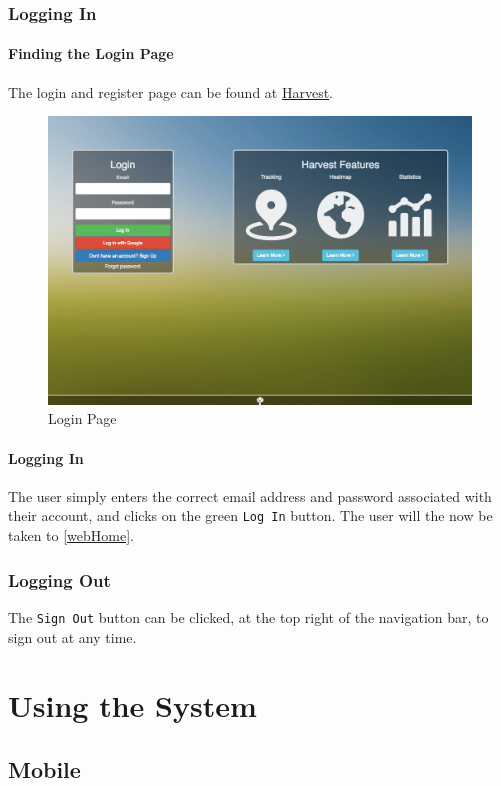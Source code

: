 \documentclass[11pt]{article}
\begin{document}
\subsubsection{Logging In}
\paragraph{Finding the Login Page}The login and register page can be found at \href{https://harvestapp.co.za}{Harvest}.

\begin{figure}
 \centering
 \includegraphics[width=12cm, keepaspectratio]{Images/GettingStarted/WebLogin.png}
 \caption{Login Page}
 \label{LoginPage}
\end{figure}

\paragraph{Logging In}The user simply enters the correct email address and password associated with their account, and clicks on the green \texttt{Log In} button. The user will the now be taken to \ref{webHome}.

\subsubsection{Logging Out}
\label{webLoggingOut}
The \texttt{Sign Out} button can be clicked, at the top right of the navigation bar, to sign out at any time.

\newpage
\section{Using the System}

\subsection{Mobile}
\end{document}
